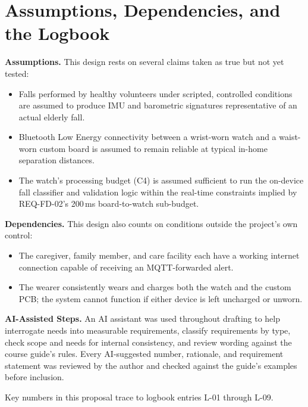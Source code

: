 \documentclass[conference,onecolumn]{IEEEtran}
\begin{document}


\section{Assumptions, Dependencies, and the Logbook}
\label{sec:assumptions}

\textbf{Assumptions.} This design rests on several claims taken as true but not yet tested:
\begin{itemize}[leftmargin=*, itemsep=2pt, topsep=2pt, partopsep=0pt]
\item Falls performed by healthy volunteers under scripted, controlled conditions are assumed to produce IMU and barometric signatures representative of an actual elderly fall.
\item Bluetooth Low Energy connectivity between a wrist-worn watch and a waist-worn custom board is assumed to remain reliable at typical in-home separation distances.
\item The watch's processing budget (C4) is assumed sufficient to run the on-device fall classifier and validation logic within the real-time constraints implied by REQ-FD-02's 200\,ms board-to-watch sub-budget.
\end{itemize}

\textbf{Dependencies.} This design also counts on conditions outside the project's own control:
\begin{itemize}[leftmargin=*, itemsep=2pt, topsep=2pt, partopsep=0pt]
\item The caregiver, family member, and care facility each have a working internet connection capable of receiving an MQTT-forwarded alert.
\item The wearer consistently wears and charges both the watch and the custom PCB; the system cannot function if either device is left uncharged or unworn.
\end{itemize}

\textbf{AI-Assisted Steps.} An AI assistant was used throughout drafting to help interrogate needs into measurable requirements, classify requirements by type, check scope and needs for internal consistency, and review wording against the course guide's rules. Every AI-suggested number, rationale, and requirement statement was reviewed by the author and checked against the guide's examples before inclusion.

Key numbers in this proposal trace to logbook entries L-01 through L-09.
\end{document}
